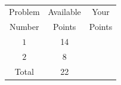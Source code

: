 \documentclass[]{exam}
\numberwithin{equation}{section}
\begin{document}
\clearpage
\normalsize
\
\vspace{.5cm}

\huge
\begin{center}
\begin{tabular}{|c|c|c|}
\hline
Problem  & Available  &   Your  \\
Number & Points &    Points  \\	\hline\hline

 $1$  & 14  &   \\	\hline
 $2$  & 8  &   \\	\hline

Total & 22  & \\ \hline
\end{tabular}
\end{center}

\pagebreak
\end{document}
